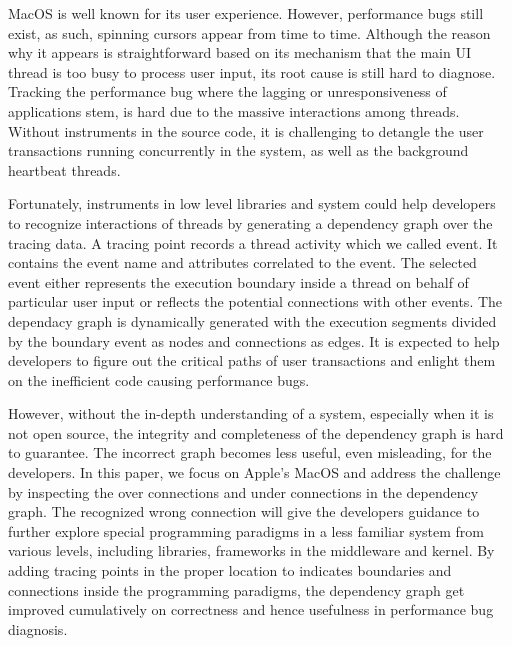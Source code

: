 MacOS is well known for its user experience.
However, performance bugs still exist, as such, spinning cursors appear from time to time.
Although the reason why it appears is straightforward based on its mechanism that the main UI thread is too busy to process user input, its root cause is still hard to diagnose.
Tracking the performance bug where the lagging or unresponsiveness of applications stem, is hard due to the massive interactions among threads.
Without instruments in the source code, it is challenging to detangle the user transactions running concurrently in the system, as well as the background heartbeat threads.
\par
Fortunately, instruments in low level libraries and system could help developers to recognize interactions of threads by generating a dependency graph over the tracing data.
A tracing point records a thread activity which we called event.
It contains the event name and attributes correlated to the event. 
The selected event either represents the execution boundary inside a thread on behalf of particular user input or reflects the potential connections with other events. 
The dependacy graph is dynamically generated with the execution segments divided by the boundary event as nodes and connections as edges.
It is expected to help developers to figure out the critical paths of user transactions and enlight them on the inefficient code causing performance bugs.
\par
However, without the in-depth understanding of a system, especially when it is not open source, the integrity and completeness of the dependency graph is hard to guarantee.
The incorrect graph becomes less useful, even misleading, for the developers.
In this paper, we focus on Apple's MacOS and address the challenge by inspecting the over connections and under connections in the dependency graph.
The recognized wrong connection will give the developers guidance to further explore special programming paradigms in a less familiar system from various levels, including libraries, frameworks in the middleware and kernel.
By adding tracing points in the proper location to indicates boundaries and connections inside the programming paradigms, the dependency graph get improved cumulatively on correctness and hence usefulness in performance bug diagnosis.
